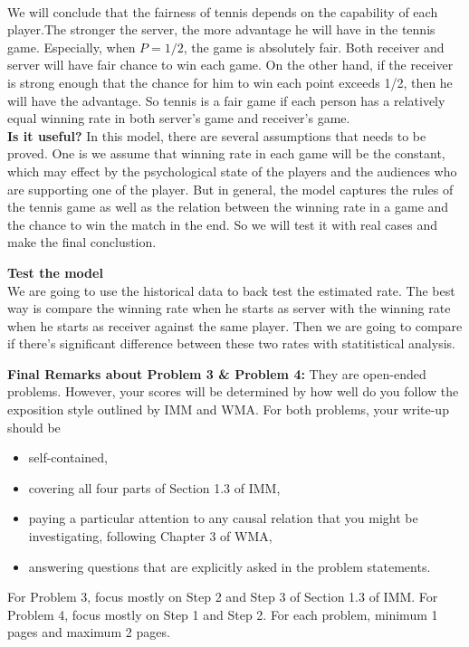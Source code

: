 \documentclass[12pt]{article}
\begin{document}
\noindent\textbf{}
\\We will conclude that the fairness of tennis depends on the capability of each player.The stronger the server, the more advantage he will have in the tennis game. Especially, when $P=1/2$, the game is absolutely fair. Both receiver and server will have fair chance to win each game. On the other hand, if the receiver is strong enough that the chance for him to win each point exceeds 1/2, then he will have the advantage. So tennis is a fair game if each person has a relatively equal winning rate in both server's game and receiver's game.\\

\noindent\textbf{Is it useful?}
In this model, there are several assumptions that needs to be proved. One is we assume that winning rate in each game will be the constant, which may effect by the psychological state of the players and the audiences who are supporting one of the player. But in general, the model captures the rules of the tennis game as well as the relation between the winning rate in a game and the chance to win the match in the end. So we will test it with real cases and make the final conclustion.

\noindent\textbf{Test the model}
\\We are going to use the historical data to back test the estimated rate. The best way is compare the winning rate when he starts as server with the winning rate when he starts as receiver against the same player. Then we are going to compare if there's significant difference between these two rates with statitistical analysis.


\vskip0.25in
\noindent\textbf{Final Remarks about Problem 3 \& Problem 4:} 
They are open-ended problems.  However, your scores will be determined
by how well do you follow the exposition style outlined by IMM and
WMA.  For both problems, your write-up should be 
\begin{itemize}
\item self-contained,
\item covering all four parts of Section 1.3 of IMM,
\item paying a particular attention to any causal relation that you
  might be investigating, following Chapter 3 of WMA,
\item answering questions that are explicitly asked in the problem statements.
\end{itemize}
For Problem 3, focus mostly on Step 2 and Step 3 of Section
1.3 of IMM.  For Problem 4, focus mostly on Step 1 and Step
2.  For each problem, minimum 1 pages and maximum 2 pages.
\end{document}
